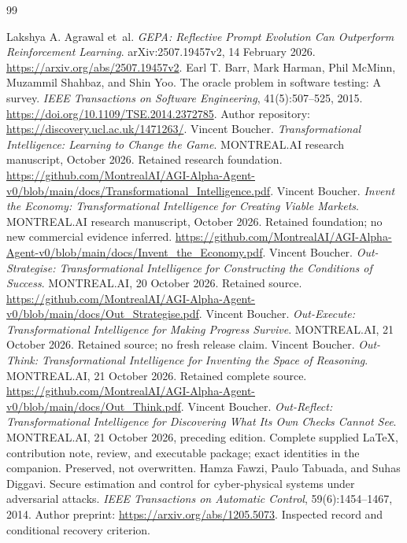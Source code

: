 \documentclass[11pt,letterpaper]{article}
\theoremstyle{remark}\newtheorem{remark}{Remark}[section]
\begin{document}
\clearpage
\begin{thebibliography}{99}
\footnotesize\raggedright\setlength{\itemsep}{.13em}\setlength{\parsep}{0pt}
Lakshya A. Agrawal et~al. \emph{GEPA: Reflective Prompt Evolution Can Outperform Reinforcement Learning}. arXiv:2507.19457v2, 14 February 2026. \url{https://arxiv.org/abs/2507.19457v2}.
Earl T. Barr, Mark Harman, Phil McMinn, Muzammil Shahbaz, and Shin Yoo. The oracle problem in software testing: A survey. \emph{IEEE Transactions on Software Engineering}, 41(5):507--525, 2015. \url{https://doi.org/10.1109/TSE.2014.2372785}. Author repository: \url{https://discovery.ucl.ac.uk/1471263/}.
Vincent Boucher. \emph{Transformational Intelligence: Learning to Change the Game}. MONTREAL.AI research manuscript, October 2026. Retained research foundation. \url{https://github.com/MontrealAI/AGI-Alpha-Agent-v0/blob/main/docs/Transformational_Intelligence.pdf}.
Vincent Boucher. \emph{Invent the Economy: Transformational Intelligence for Creating Viable Markets}. MONTREAL.AI research manuscript, October 2026. Retained foundation; no new commercial evidence inferred. \url{https://github.com/MontrealAI/AGI-Alpha-Agent-v0/blob/main/docs/Invent_the_Economy.pdf}.
Vincent Boucher. \emph{Out-Strategise: Transformational Intelligence for Constructing the Conditions of Success}. MONTREAL.AI, 20 October 2026. Retained source. \url{https://github.com/MontrealAI/AGI-Alpha-Agent-v0/blob/main/docs/Out_Strategise.pdf}.
Vincent Boucher. \emph{Out-Execute: Transformational Intelligence for Making Progress Survive}. MONTREAL.AI, 21 October 2026. Retained source; no fresh release claim.
Vincent Boucher. \emph{Out-Think: Transformational Intelligence for Inventing the Space of Reasoning}. MONTREAL.AI, 21 October 2026. Retained complete source. \url{https://github.com/MontrealAI/AGI-Alpha-Agent-v0/blob/main/docs/Out_Think.pdf}.
Vincent Boucher. \emph{Out-Reflect: Transformational Intelligence for Discovering What Its Own Checks Cannot See}. MONTREAL.AI, 21 October 2026, preceding edition. Complete supplied LaTeX, contribution note, review, and executable package; exact identities in the companion. Preserved, not overwritten.
Hamza Fawzi, Paulo Tabuada, and Suhas Diggavi. Secure estimation and control for cyber-physical systems under adversarial attacks. \emph{IEEE Transactions on Automatic Control}, 59(6):1454--1467, 2014. Author preprint: \url{https://arxiv.org/abs/1205.5073}. Inspected record and conditional recovery criterion.

\end{thebibliography}
\end{document}
